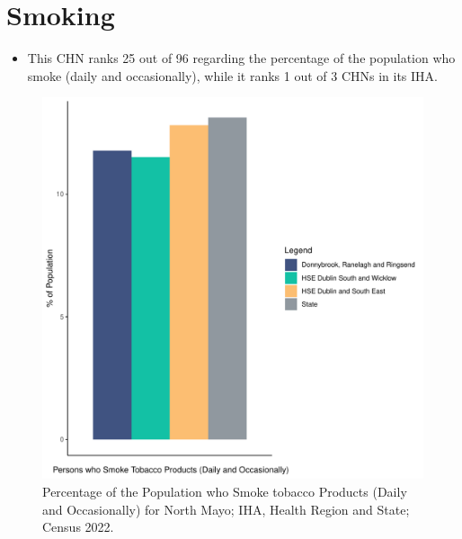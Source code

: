 \documentclass{article}
\begin{document}
\pagebreak

\section{Smoking}\label{sect:Smoking}
\begin{itemize}
\item This CHN ranks  25 out of 96 regarding the percentage of the population who smoke (daily and occasionally), while it ranks   1 out of 3 CHNs in its IHA.
\end{itemize}
\begin{figure}[H]
	\centering
	\includegraphics[width = 120mm]{../figures/SmokingED.pdf}
	\caption{Percentage of the Population who Smoke tobacco Products (Daily and Occasionally) for North Mayo; IHA, Health Region and State; Census 2022.}
	\label{fig:2ae19629-1a6a-13a3-e055-000000000001}
	\end{figure}
	
\end{document}

